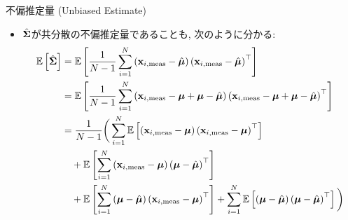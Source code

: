 \documentclass[dvipdfmx,notheorems,t]{beamer}
\begin{document}
\begin{frame}{不偏推定量 (Unbiased Estimate)}
\begin{itemize}
  \item $\hat{\vb*{\Sigma}}$が共分散の不偏推定量であることも, 次のように分かる:
  {\small \begin{align*}
    \operatorname{\mathbb{E}} \left[ \hat{\vb*{\Sigma}} \right] &= \operatorname{\mathbb{E}} \left[ \frac{1}{N - 1} \sum_{i = 1}^N
      \left( \vb{x}_{i, \mathrm{meas}} - \hat{\vb*{\mu}} \right)
      \left( \vb{x}_{i, \mathrm{meas}} - \hat{\vb*{\mu}} \right)^\top \right] \\
    &= \operatorname{\mathbb{E}} \left[ \frac{1}{N - 1} \sum_{i = 1}^N
      \left( \vb{x}_{i, \mathrm{meas}} - \vb*{\mu} + \vb*{\mu} - \hat{\vb*{\mu}} \right)
      \left( \vb{x}_{i, \mathrm{meas}} - \vb*{\mu} + \vb*{\mu} - \hat{\vb*{\mu}} \right)^\top \right] \\
    &= \frac{1}{N - 1} \bigg( \sum_{i = 1}^N
      \operatorname{\mathbb{E}} \left[ \left( \vb{x}_{i, \mathrm{meas}} - \vb*{\mu} \right)
      \left( \vb{x}_{i, \mathrm{meas}} - \vb*{\mu} \right)^\top \right] \\
    & \quad + \operatorname{\mathbb{E}} \left[ \sum_{i = 1}^N \left( \vb{x}_{i, \mathrm{meas}} - \vb*{\mu} \right)
      \left( \vb*{\mu} - \hat{\vb*{\mu}} \right)^\top \right] \\
    & \quad + \operatorname{\mathbb{E}} \left[ \sum_{i = 1}^N \left( \vb*{\mu} - \hat{\vb*{\mu}} \right)
      \left( \vb{x}_{i, \mathrm{meas}} - \vb*{\mu} \right)^\top \right]
      + \sum_{i = 1}^N \operatorname{\mathbb{E}} \left[ \left( \vb*{\mu} - \hat{\vb*{\mu}} \right)
      \left( \vb*{\mu} - \hat{\vb*{\mu}} \right)^\top \right] \bigg)
  \end{align*}}
\end{itemize}
\end{frame}
\end{document}
